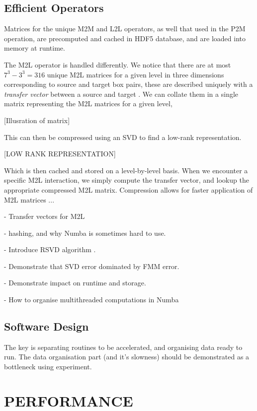 \documentclass{IEEEcsmag}
\begin{document}
\subsection{Efficient Operators}

Matrices for the unique M2M and L2L operators, as well that used in the P2M operation, are precomputed and cached in HDF5 database, and are loaded into memory at runtime.

The M2L operator is handled differently. We notice that there are at most $7^3-3^3=316$ unique M2L matrices for a given level in three dimensions corresponding to source and target box pairs, these are described uniquely with a \textit{transfer vector} between a source and target \cite{Fong2009}. We can collate them in a single matrix representing the M2L matrices for a given level,

[Illusration of matrix]

This can then be compressed using an SVD to find a low-rank representation.

[LOW RANK REPRESENTATION]

Which is then cached and stored on a level-by-level basis. When we encounter a specific M2L interaction, we simply compute the transfer vector, and lookup the appropriate compressed M2L matrix. Compression allows for faster application of M2L matrices ...

- Transfer vectors for M2L

- hashing, and why Numba is sometimes hard to use.

- Introduce RSVD algorithm \cite{Halko2011}.

- Demonstrate that SVD error dominated by FMM error.

- Demonstrate impact on runtime and storage.

- How to organise multithreaded computations in Numba

\subsection{Software Design}

The key is separating routines to be accelerated, and organising data ready to run. The data organisation part (and it's slowness) should be demonstrated as a bottleneck using experiment.

\section{PERFORMANCE}
\end{document}
